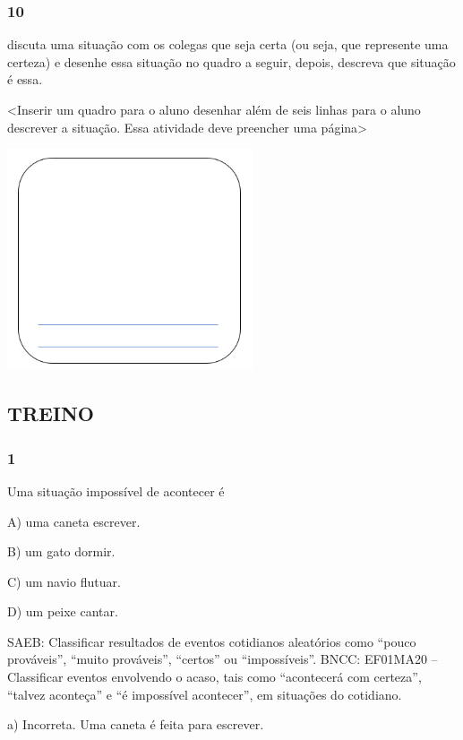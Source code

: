 \subsubsection{10}\label{section-72}

discuta uma situação com os colegas que seja certa (ou seja, que represente uma certeza) e desenhe essa
situação no quadro a seguir, depois, descreva que situação é essa.

\textless{}Inserir um quadro para o aluno desenhar além de seis linhas
para o aluno descrever a situação. Essa atividade deve preencher uma
página\textgreater{}

\includegraphics[width=2.86272in,height=2.57423in]{media/image92.png}


\subsection{TREINO}\label{treino-5}

\subsubsection{1}\label{section-73}

Uma situação impossível de acontecer é

A) uma caneta escrever.

B) um gato dormir.

C) um navio flutuar.

D) um peixe cantar.

SAEB: Classificar resultados de eventos cotidianos aleatórios como
``pouco prováveis'', ``muito prováveis'', ``certos'' ou ``impossíveis''.
BNCC: EF01MA20 -- Classificar eventos envolvendo o acaso, tais como
``acontecerá com certeza'', ``talvez aconteça'' e ``é impossível
acontecer'', em situações do cotidiano.

a) Incorreta. Uma caneta é feita para escrever.

